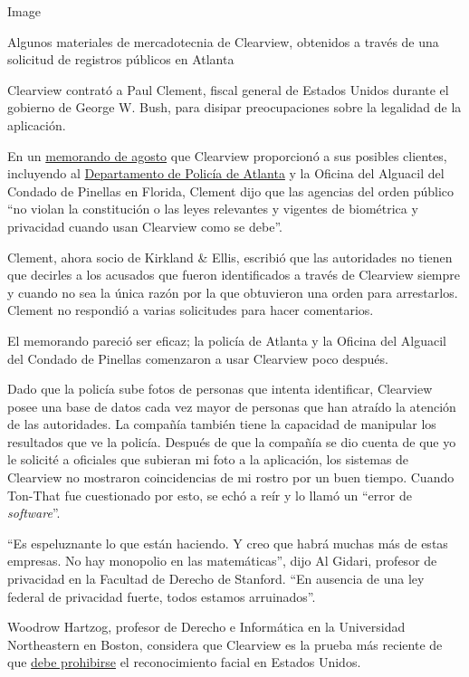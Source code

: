 Image

Algunos materiales de mercadotecnia de Clearview, obtenidos a través de
una solicitud de registros públicos en Atlanta

Clearview contrató a Paul Clement, fiscal general de Estados Unidos
durante el gobierno de George W. Bush, para disipar preocupaciones sobre
la legalidad de la aplicación.

En un
\href{https://int.nyt.com/data/documenthelper/6689-clearview-legal-memo/c8b081a0bcca12e7903a/optimized/full.pdf\#page=1}{memorando
de agosto} que Clearview proporcionó a sus posibles clientes, incluyendo
al
\href{https://www.muckrock.com/foi/atlanta-325/facial-recognition-atlanta-ga-76491/}{Departamento
de Policía de Atlanta} y la Oficina del Alguacil del Condado de Pinellas
en Florida, Clement dijo que las agencias del orden público ``no violan
la constitución o las leyes relevantes y vigentes de biométrica y
privacidad cuando usan Clearview como se debe''.

Clement, ahora socio de Kirkland \& Ellis, escribió que las autoridades
no tienen que decirles a los acusados que fueron identificados a través
de Clearview siempre y cuando no sea la única razón por la que
obtuvieron una orden para arrestarlos. Clement no respondió a varias
solicitudes para hacer comentarios.

El memorando pareció ser eficaz; la policía de Atlanta y la Oficina del
Alguacil del Condado de Pinellas comenzaron a usar Clearview poco
después.

Dado que la policía sube fotos de personas que intenta identificar,
Clearview posee una base de datos cada vez mayor de personas que han
atraído la atención de las autoridades. La compañía también tiene la
capacidad de manipular los resultados que ve la policía. Después de que
la compañía se dio cuenta de que yo le solicité a oficiales que subieran
mi foto a la aplicación, los sistemas de Clearview no mostraron
coincidencias de mi rostro por un buen tiempo. Cuando Ton-That fue
cuestionado por esto, se echó a reír y lo llamó un ``error de
\emph{software}''.

``Es espeluznante lo que están haciendo. Y creo que habrá muchas más de
estas empresas. No hay monopolio en las matemáticas'', dijo Al Gidari,
profesor de privacidad en la Facultad de Derecho de Stanford. ``En
ausencia de una ley federal de privacidad fuerte, todos estamos
arruinados''.

Woodrow Hartzog, profesor de Derecho e Informática en la Universidad
Northeastern en Boston, considera que Clearview es la prueba más
reciente de que
\href{https://www.nytimes.com/2019/10/17/opinion/facial-recognition-ban.html}{debe
prohibirse} el reconocimiento facial en Estados Unidos.

